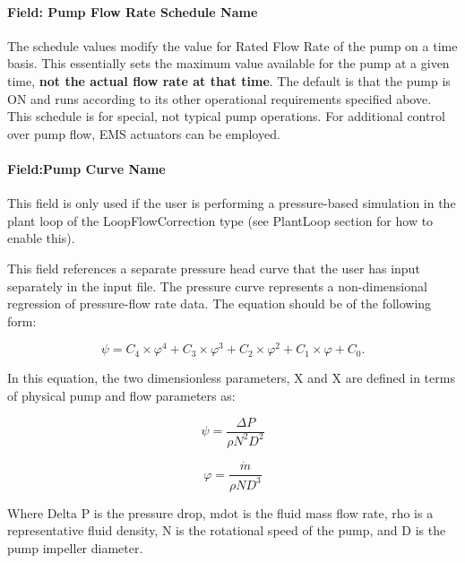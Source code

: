 \paragraph{Field: Pump Flow Rate Schedule Name}\label{field-pump-flow-rate-schedule-name-1}

The schedule values modify the value for Rated Flow Rate of the pump on a time basis. This essentially sets the maximum value available for the pump at a given time, \textbf{not the actual flow rate at that time}. The default is that the pump is ON and runs according to its other operational requirements specified above. This schedule is for special, not typical pump operations. For additional control over pump flow, EMS actuators can be employed.

\paragraph{Field:Pump Curve Name}\label{fieldpump-curve-name}

This field is only used if the user is performing a pressure-based simulation in the plant loop of the LoopFlowCorrection type (see PlantLoop section for how to enable this).

This field references a separate pressure head curve that the user has input separately in the input file. The pressure curve represents a non-dimensional regression of pressure-flow rate data. The equation should be of the following form:

\begin{equation}
\psi  = {C_4} \times {\varphi ^4} + {C_3} \times {\varphi ^3} + {C_2} \times {\varphi ^2} + {C_1} \times \varphi  + {C_0}.
\end{equation}

In this equation, the two dimensionless parameters, X and X are defined in terms of physical pump and flow parameters as:

\begin{equation}
\psi  = \frac{{\Delta P}}{{\rho {N^2}{D^2}}}
\end{equation}

\begin{equation}
\varphi  = \frac{{\dot m}}{{\rho N{D^3}}}
\end{equation}

Where Delta P is the pressure drop, mdot is the fluid mass flow rate, rho is a representative fluid density, N is the rotational speed of the pump, and D is the pump impeller diameter.


